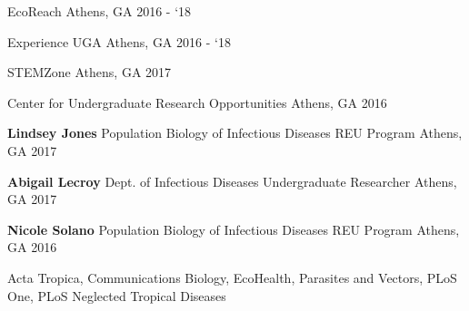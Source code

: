 

\begin{cvhonors}


    \cvhonor
      {EcoReach}
      {}
      {Athens, GA}
      {2016 - `18}

    \cvhonor
      {Experience UGA}
      {}
      {Athens, GA}
      {2016 - `18}

    \cvhonor
      {STEMZone}
      {}
      {Athens, GA}
      {2017}

    \cvhonor
      {Center for Undergraduate Research Opportunities} %
      {} %
      {Athens, GA} %
      {2016} %
\end{cvhonors}

\begin{cvhonors}

  \cvhonor
    {\textbf{Lindsey Jones}} %
    {Population Biology of Infectious Diseases REU Program} %
    {Athens, GA} %
    {2017} %

  \cvhonor
    {\textbf{Abigail Lecroy}} %
    {Dept. of Infectious Diseases Undergraduate Researcher} %
    {Athens, GA} %
    {2017} %

  \cvhonor
    {\textbf{Nicole Solano}} %
    {Population Biology of Infectious Diseases REU Program} %
    {Athens, GA} %
    {2016} %

\end{cvhonors}


Acta Tropica, Communications Biology, EcoHealth, Parasites and Vectors, PLoS One, PLoS Neglected Tropical Diseases
